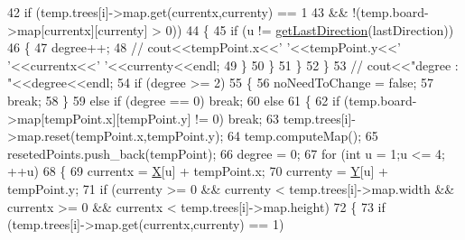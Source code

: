 \begin{DoxyCode}
42                                     \textcolor{keywordflow}{if} (temp.trees[i]->map.get(currentx,currenty) == 1 
43                                     && !(temp.board->map[currentx][currenty] > 0)) 
44                                     \{
45                                         \textcolor{keywordflow}{if} (u != \hyperlink{classCleverOptimize_ac1cf58abb7c91bbabffde680d06226af}{getLastDirection}(lastDirection))
46                                         \{
47                                             degree++;
48                                             \textcolor{comment}{// cout<<tempPoint.x<<' '<<tempPoint.y<<' '<<currentx<<'
       '<<currenty<<endl;}
49                                         \}
50                                     \}
51                                 \}
52                             \}
53                             \textcolor{comment}{// cout<<"degree : "<<degree<<endl;}
54                             \textcolor{keywordflow}{if} (degree >= 2)
55                             \{
56                                 noNeedToChange = \textcolor{keyword}{false};
57                                 \textcolor{keywordflow}{break};
58                             \}
59                             \textcolor{keywordflow}{else} \textcolor{keywordflow}{if} (degree == 0) \textcolor{keywordflow}{break};
60                             \textcolor{keywordflow}{else}
61                             \{
62                                 \textcolor{keywordflow}{if} (temp.board->map[tempPoint.x][tempPoint.y] != 0) \textcolor{keywordflow}{break};
63                                 temp.trees[i]->map.reset(tempPoint.x,tempPoint.y);
64                                 temp.computeMap();
65                                 resetedPoints.push\_back(tempPoint);
66                                 degree = 0;
67                                 \textcolor{keywordflow}{for} (\textcolor{keywordtype}{int} u = 1;u <= 4; ++u)
68                                 \{
69                                     currentx = \hyperlink{CleverOptimizie_8cpp_a34adaf40bb2f109e151ba28ccc73c677}{X}[u] + tempPoint.x;
70                                     currenty = \hyperlink{CleverOptimizie_8cpp_a86f15c23d2ab23bfebe784c368885663}{Y}[u] + tempPoint.y;
71                                     \textcolor{keywordflow}{if} (currenty >= 0 && currenty < temp.trees[i]->map.width && currentx >=
       0 && currentx < temp.trees[i]->map.height)
72                                     \{
73                                         \textcolor{keywordflow}{if} (temp.trees[i]->map.get(currentx,currenty) == 1) 

\end{DoxyCode}
